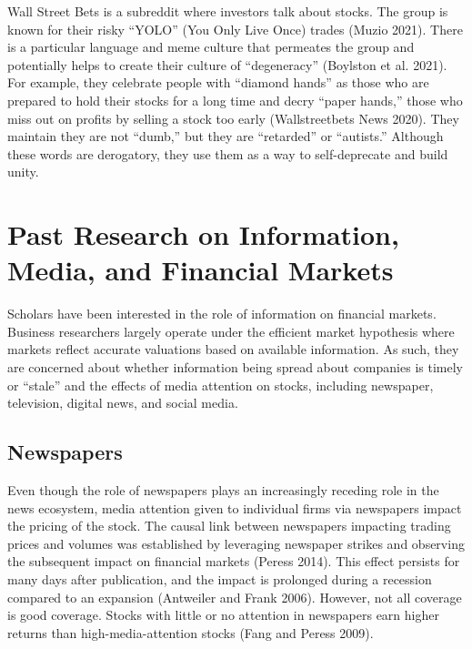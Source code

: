 \documentclass[12pt,]{article}
\begin{document}
Wall Street Bets is a subreddit where investors talk about stocks. The
group is known for their risky ``YOLO'' (You Only Live Once) trades
(Muzio 2021). There is a particular language and meme culture that
permeates the group and potentially helps to create their culture of
``degeneracy'' (Boylston et al. 2021). For example, they celebrate
people with ``diamond hands'' as those who are prepared to hold their
stocks for a long time and decry ``paper hands,'' those who miss out on
profits by selling a stock too early (Wallstreetbets News 2020). They
maintain they are not ``dumb,'' but they are ``retarded'' or
``autists.'' Although these words are derogatory, they use them as a way
to self-deprecate and build unity.

\hypertarget{past-research-on-information-media-and-financial-markets}{%
\section{Past Research on Information, Media, and Financial
Markets}\label{past-research-on-information-media-and-financial-markets}}

Scholars have been interested in the role of information on financial
markets. Business researchers largely operate under the efficient market
hypothesis where markets reflect accurate valuations based on available
information. As such, they are concerned about whether information being
spread about companies is timely or ``stale'' and the effects of media
attention on stocks, including newspaper, television, digital news, and
social media.

\hypertarget{newspapers}{%
\subsection{Newspapers}\label{newspapers}}

Even though the role of newspapers plays an increasingly receding role
in the news ecosystem, media attention given to individual firms via
newspapers impact the pricing of the stock. The causal link between
newspapers impacting trading prices and volumes was established by
leveraging newspaper strikes and observing the subsequent impact on
financial markets (Peress 2014). This effect persists for many days
after publication, and the impact is prolonged during a recession
compared to an expansion (Antweiler and Frank 2006). However, not all
coverage is good coverage. Stocks with little or no attention in
newspapers earn higher returns than high-media-attention stocks (Fang
and Peress 2009).
\end{document}
